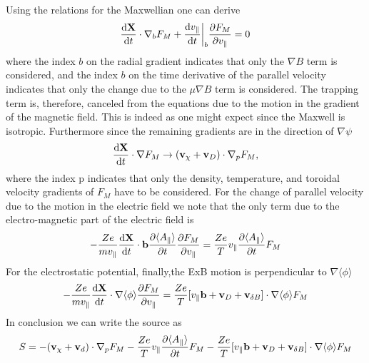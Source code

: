 \documentclass{report}
\def\be{\begin{equation}}
\def\ee{\end{equation}}
\begin{document}
Using the relations for the Maxwellian one can derive 
\be 
{{\rm d} {\bf X} \over {\rm d} t } \cdot \nabla_b F_M + {{\rm d} v_\parallel \over {\rm d} t} \biggr \vert_b 
{\partial F_M \over \partial v_\parallel} = 0
\ee
where the index $b$ on the radial gradient indicates that only the $\nabla B$ term is considered, and 
the index $b$ on the time derivative of the parallel velocity indicates that only the change due to the 
$\mu \nabla B$ term is considered. 
The trapping term is, therefore, canceled from the equations due to the motion in the gradient of the 
magnetic field. This is indeed as one might expect since the Maxwell is isotropic. 
Furthermore since the remaining gradients are in the direction of $\nabla \psi$ 
\be 
{{\rm d} {\bf X } \over {\rm d} t } \cdot \nabla F_M \rightarrow ({\bf v}_\chi + {\bf v}_D) \cdot 
\nabla_p F_M,  
\ee
where the index p indicates that only the density, temperature, and toroidal velocity gradients of $F_M$ have 
to be considered. 
For the change of parallel velocity due to the motion in the electric field we note that the only 
term due to the electro-magnetic part of the electric field is 
\be 
- {Z e \over m v_\parallel } {{\rm d} {\bf X } \over {\rm d} t }\cdot {\bf b} {\partial \langle A_\parallel \rangle 
\over \partial t} {\partial F_M \over \partial v_\parallel} 
=  {Z e \over T} v_\parallel {\partial \langle A_\parallel \rangle \over \partial t} F_M 
\ee
For the electrostatic potential, finally,the ExB motion is perpendicular to $\nabla \langle \phi \rangle$ 
\be 
- {Z e \over m v_\parallel } {{\rm d} {\bf X } \over {\rm d} t }\cdot \nabla \langle \phi \rangle 
{\partial F_M \over \partial v_\parallel} = {Ze \over T} [ v_\parallel {\bf b} + {\bf v}_D + {\bf v}_{\delta B} ] 
\cdot \nabla \langle \phi \rangle F_M 
\ee 
In conclusion we can write the source as  
\be 
S =  - ({\bf v}_\chi + {\bf v}_d) \cdot \nabla_p F_M -  {Z e \over T} v_\parallel {\partial \langle A_\parallel \rangle \over \partial t} F_M 
-  {Ze \over T} [ v_\parallel {\bf b} + {\bf v}_D + {\bf v}_{\delta B} ] \cdot \nabla \langle \phi \rangle F_M 
\ee
\end{document}

